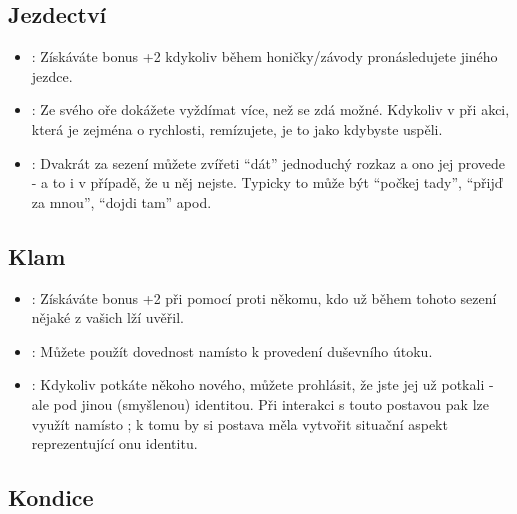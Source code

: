 \subsection{Jezdectví}
\label{sec:trik-jezd}
\begin{itemize}
  
\item{}:
\label{sec:jezdectvi-kliste}
Získáváte bonus +2 kdykoliv během honičky/závody pronásledujete jiného jezdce.

\item{}:
\label{sec:jezdectvi-hyje}
Ze svého oře dokážete vyždímat více, než se zdá možné. Kdykoliv v při akci, která je zejména o rychlosti, remízujete, je to jako kdybyste uspěli.

\item{}:
\label{sec:jezdectvi-kamos}
Dvakrát za sezení můžete zvířeti ``dát'' jednoduchý rozkaz a ono jej provede - a to i v případě, že u něj nejste. Typicky to může být ``počkej tady'', ``přijď za mnou'', ``dojdi tam'' apod.

\end{itemize}

\subsection{Klam}
\label{sec:trik-klam}

\begin{itemize}
\item{}:
\label{sec:klam-lez}
Získáváte bonus +2 při  pomocí  proti někomu, kdo už během tohoto sezení nějaké z vašich lží uvěřil.

\item{}:
\label{sec:klam-mysl}
Můžete použít dovednost  namísto  k provedení duševního útoku.

\item{}:
\label{sec:klam-muz}
Kdykoliv potkáte někoho nového, můžete prohlásit, že jste jej už potkali - ale pod jinou (smyšlenou) identitou. Při interakci s touto postavou pak lze využít  namísto ; k tomu by si postava měla vytvořit situační aspekt reprezentující onu identitu.
\end{itemize}

\subsection{Kondice}
\label{sec:trik-kondice}

